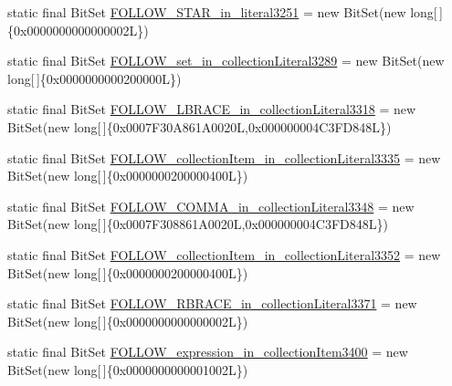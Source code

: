 \begin{DoxyCompactItemize}
static final Bit\-Set \hyperlink{classorg_1_1tzi_1_1use_1_1parser_1_1shell_1_1_shell_command_parser_a8d650fdc6213ce60fe33bc26e8722021}{F\-O\-L\-L\-O\-W\-\_\-\-S\-T\-A\-R\-\_\-in\-\_\-literal3251} = new Bit\-Set(new long\mbox{[}$\,$\mbox{]}\{0x0000000000000002\-L\})
\item 
static final Bit\-Set \hyperlink{classorg_1_1tzi_1_1use_1_1parser_1_1shell_1_1_shell_command_parser_a35bbdbf1e8814733b17dad191ce437a6}{F\-O\-L\-L\-O\-W\-\_\-set\-\_\-in\-\_\-collection\-Literal3289} = new Bit\-Set(new long\mbox{[}$\,$\mbox{]}\{0x0000000000200000\-L\})
\item 
static final Bit\-Set \hyperlink{classorg_1_1tzi_1_1use_1_1parser_1_1shell_1_1_shell_command_parser_a1b14e551fe79a40b5f7c21ae70bc4b33}{F\-O\-L\-L\-O\-W\-\_\-\-L\-B\-R\-A\-C\-E\-\_\-in\-\_\-collection\-Literal3318} = new Bit\-Set(new long\mbox{[}$\,$\mbox{]}\{0x0007\-F30\-A861\-A0020\-L,0x000000004\-C3\-F\-D848\-L\})
\item 
static final Bit\-Set \hyperlink{classorg_1_1tzi_1_1use_1_1parser_1_1shell_1_1_shell_command_parser_a2f719fef149a02bbf27e95654717eddd}{F\-O\-L\-L\-O\-W\-\_\-collection\-Item\-\_\-in\-\_\-collection\-Literal3335} = new Bit\-Set(new long\mbox{[}$\,$\mbox{]}\{0x0000000200000400\-L\})
\item 
static final Bit\-Set \hyperlink{classorg_1_1tzi_1_1use_1_1parser_1_1shell_1_1_shell_command_parser_a4ab185191603d439594b2da84548ab95}{F\-O\-L\-L\-O\-W\-\_\-\-C\-O\-M\-M\-A\-\_\-in\-\_\-collection\-Literal3348} = new Bit\-Set(new long\mbox{[}$\,$\mbox{]}\{0x0007\-F308861\-A0020\-L,0x000000004\-C3\-F\-D848\-L\})
\item 
static final Bit\-Set \hyperlink{classorg_1_1tzi_1_1use_1_1parser_1_1shell_1_1_shell_command_parser_aee61faa632abdc620b07bf4154e13102}{F\-O\-L\-L\-O\-W\-\_\-collection\-Item\-\_\-in\-\_\-collection\-Literal3352} = new Bit\-Set(new long\mbox{[}$\,$\mbox{]}\{0x0000000200000400\-L\})
\item 
static final Bit\-Set \hyperlink{classorg_1_1tzi_1_1use_1_1parser_1_1shell_1_1_shell_command_parser_a8790fc4b5697473b1f19fabe6e30a3d2}{F\-O\-L\-L\-O\-W\-\_\-\-R\-B\-R\-A\-C\-E\-\_\-in\-\_\-collection\-Literal3371} = new Bit\-Set(new long\mbox{[}$\,$\mbox{]}\{0x0000000000000002\-L\})
\item 
static final Bit\-Set \hyperlink{classorg_1_1tzi_1_1use_1_1parser_1_1shell_1_1_shell_command_parser_a2b17145dfe6a13786930fd8ee837c07d}{F\-O\-L\-L\-O\-W\-\_\-expression\-\_\-in\-\_\-collection\-Item3400} = new Bit\-Set(new long\mbox{[}$\,$\mbox{]}\{0x0000000000001002\-L\})

\end{DoxyCompactItemize}
